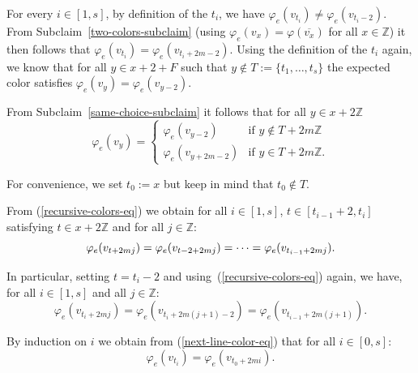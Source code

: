 \documentclass[a4paper,10pt,hidelinks]{amsart}
\renewcommand{\phi}{\ensuremath{\varphi}}
\newenvironment{claimproof}[1][\proofname]{\proof[#1]\renewcommand{\qedsymbol}{$\blacksquare$}}{\endproof}
\theoremstyle{definition}
\begin{document}
\begin{claimproof}[Proof of Claim~\ref{structure-claim} when $k \in \{6,8\}$]
        For every $i \in [1, s]$, by definition of the $t_i$, we have $\varphi_e(v_{t_i}) \neq \varphi_e(v_{t_i - 2})$. From Subclaim~\ref{two-colors-subclaim} (using $\phi_e(v_x)=\phi(\overline{v_x})$ for all $x\in \mathbb{Z}$) it then follows that $\varphi_e(v_{t_i}) = \varphi_e(v_{t_i + 2m - 2}).$
        Using the definition of the $t_i$ again, we know that for all $y \in x + 2 + F$ such that $y \notin T := \{t_1, \dots, t_s\}$ the expected color satisfies $\varphi_e(v_{y}) = \varphi_e(v_{y -2})$. 

        From Subclaim~\ref{same-choice-subclaim} it follows that for all $y \in x + 2\mathbb{Z}$
        \begin{equation}\label{recursive-colors-eq}
            \varphi_e(v_y) =
            \begin{cases}
                \varphi_e(v_{y - 2}) &\text{if } y \notin T + 2m\mathbb{Z}\\ 
                \varphi_e(v_{y + 2m - 2}) &\text{if } y \in T + 2m\mathbb{Z}.
            \end{cases}
        \end{equation}
        
        For convenience, we set $t_0 := x$ but keep in mind that $t_0 \notin T$.

        From (\ref{recursive-colors-eq}) we obtain for all $i \in [1, s]$, $t \in [t_{i - 1} + 2, t_{i}]$ satisfying $t \in x + 2\mathbb{Z}$ and for all $j \in \mathbb{Z}$: 
        \begin{equation}\notag
            \varphi_e(v_{t + 2mj}) = \varphi_e(v_{t - 2 + 2mj}) = \dots = \varphi_e(v_{t_{i - 1} + 2mj}). 
        \end{equation}

        In particular, setting $t = t_i - 2$ and using~(\ref{recursive-colors-eq}) again, we have, for all $i \in [1, s]$ and all $j \in \mathbb{Z}$:
        \begin{equation}\label{next-line-color-eq}
            \varphi_e(v_{t_i + 2mj}) = \varphi_e(v_{t_i + 2m(j + 1) - 2}) = \varphi_e(v_{t_{i - 1} + 2m(j + 1)}).
        \end{equation}

        By induction on $i$ we obtain from (\ref{next-line-color-eq}) that for all $i \in [0, s]$:
        \begin{equation}\label{starting-colors-eq}
            \varphi_e(v_{t_i}) = \varphi_e(v_{t_0 + 2mi}).
        \end{equation}


\end{claimproof}
\end{document}
